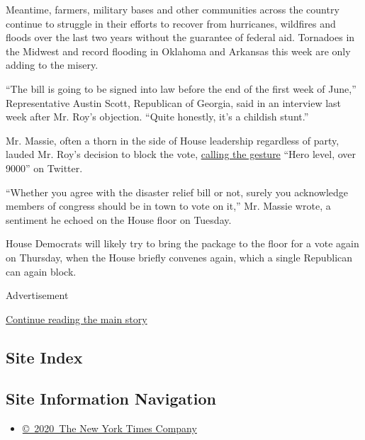 Meantime, farmers, military bases and other communities across the
country continue to struggle in their efforts to recover from
hurricanes, wildfires and floods over the last two years without the
guarantee of federal aid. Tornadoes in the Midwest and record flooding
in Oklahoma and Arkansas this week are only adding to the misery.

``The bill is going to be signed into law before the end of the first
week of June,'' Representative Austin Scott, Republican of Georgia, said
in an interview last week after Mr. Roy's objection. ``Quite honestly,
it's a childish stunt.''

Mr. Massie, often a thorn in the side of House leadership regardless of
party, lauded Mr. Roy's decision to block the vote,
\href{https://twitter.com/RepThomasMassie/status/1131968599168561152}{calling
the gesture} ``Hero level, over 9000'' on Twitter.

``Whether you agree with the disaster relief bill or not, surely you
acknowledge members of congress should be in town to vote on it,'' Mr.
Massie wrote, a sentiment he echoed on the House floor on Tuesday.

House Democrats will likely try to bring the package to the floor for a
vote again on Thursday, when the House briefly convenes again, which a
single Republican can again block.

Advertisement

\protect\hyperlink{after-bottom}{Continue reading the main story}

\hypertarget{site-index}{%
\subsection{Site Index}\label{site-index}}

\hypertarget{site-information-navigation}{%
\subsection{Site Information
Navigation}\label{site-information-navigation}}

\begin{itemize}
\tightlist
\item
  \href{https://help.nytimes.com/hc/en-us/articles/115014792127-Copyright-notice}{©~2020~The
  New York Times Company}
\end{itemize}

